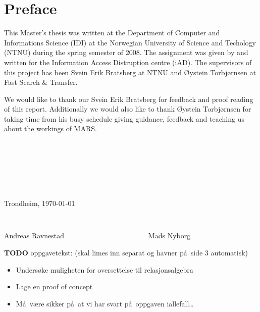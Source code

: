 \chapter*{Preface}

This Master's thesis was written at the Department of Computer and Informations Science (IDI) at the
Norwegian University of Science and Techology (NTNU) during the spring semester of 2008. The assignment was given
by and written for the Information Access Distruption centre (iAD). The supervisors of this project has been Svein
Erik Bratsberg at NTNU and \O ystein Torbj\o rnsen at Fast Search \& Transfer.

We would like to thank our Svein Erik Bratsberg for feedback and proof reading of this report. Additionally we
would also like to thank \O ystein Torbj\o rnsen for taking time from his busy schedule giving guidance, feedback
and teaching us about the workings of MARS.

\begin{verbatim}







\end{verbatim}
\begin{center}

Trondheim, \today

\begin{verbatim}


\end{verbatim}
Andreas Ravnestad \verb!                      ! Mads Nyborg
\end{center}

\textbf{\LARGE TODO} oppgavetekst: (skal limes inn separat og havner p\aa~side 3 automatisk)

\begin{itemize}
  \item Unders\o ke muligheten for oversettelse til relasjonsalgebra
  \item Lage en proof of concept
  \item M\aa~v\ae re sikker p\aa~at vi har svart p\aa~oppgaven iallefall\ldots
\end{itemize}
